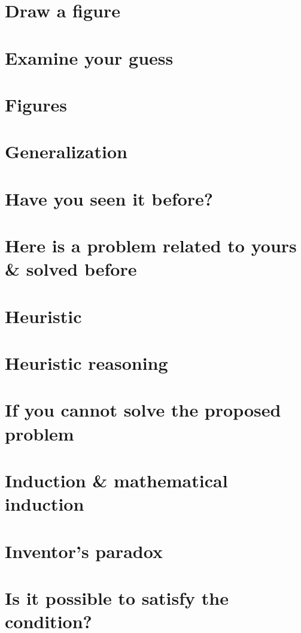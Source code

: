 \documentclass[oneside]{book}
\numberwithin{equation}{section}
\begin{document}
\section*{Draw a figure}

\section*{Examine your guess}

\section*{Figures}

\section*{Generalization}

\section*{Have you seen it before?}

\section*{Here is a problem related to yours \& solved before}

\section*{Heuristic}

\section*{Heuristic reasoning}

\section*{If you cannot solve the proposed problem}

\section*{Induction \& mathematical induction}

\section*{Inventor's paradox}

\section*{Is it possible to satisfy the condition?}
\end{document}
